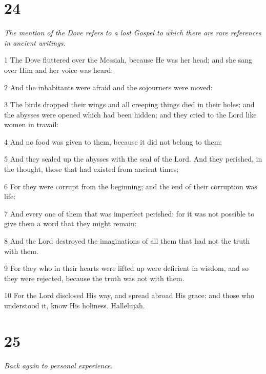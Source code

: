 \chapter{24}

\par \textit{The mention of the Dove refers to a lost Gospel to which there are rare references in ancient writings.}

\par 1 The Dove fluttered over the Messiah, because He was her head; and she sang over Him and her voice was heard:
\par 2 And the inhabitants were afraid and the sojourners were moved:
\par 3 The birds dropped their wings and all creeping things died in their holes: and the abysses were opened which had been hidden; and they cried to the Lord like women in travail:
\par 4 And no food was given to them, because it did not belong to them;
\par 5 And they sealed up the abysses with the seal of the Lord. And they perished, in the thought, those that had existed from ancient times;
\par 6 For they were corrupt from the beginning; and the end of their corruption was life:
\par 7 And every one of them that was imperfect perished: for it was not possible to give them a word that they might remain:
\par 8 And the Lord destroyed the imaginations of all them that had not the truth with them.
\par 9 For they who in their hearts were lifted up were deficient in wisdom, and so they were rejected, because the truth was not with them.
\par 10 For the Lord disclosed His way, and spread abroad His grace: and those who understood it, know His holiness. Hallelujah.

\chapter{25}

\par \textit{Back again to personal experience.}

